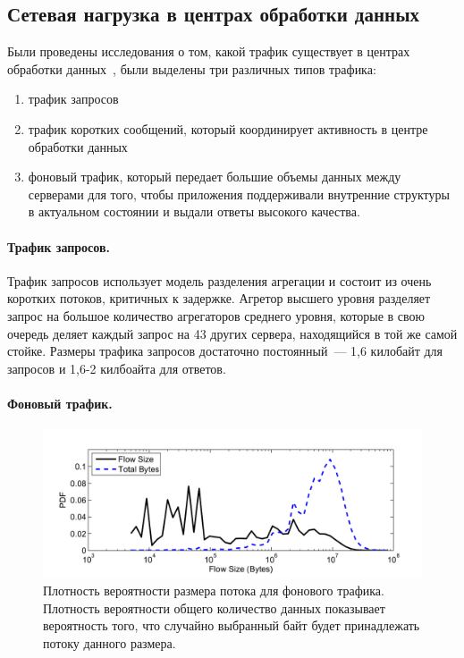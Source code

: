 \documentclass[14pt, a4paper,oneside]{extarticle}
\begin{document}
\subsection{Сетевая нагрузка в центрах обработки данных}
Были проведены исследования о том, какой трафик существует в центрах обработки данных~\cite{dctcp}, были выделены три различных типов трафика:
\begin{enumerate}
\item трафик запросов
\item трафик коротких сообщений, который координирует активность в центре обработки данных
\item фоновый трафик, который передает большие объемы данных между серверами для того, чтобы приложения поддерживали внутренние структуры в актуальном состоянии и выдали ответы высокого качества.
\end{enumerate}

\paragraph{Трафик запросов.}
Трафик запросов использует модель разделения агрегации и состоит из очень коротких потоков, критичных к задержке. Агретор высшего уровня разделяет запрос на большое количество агрегаторов среднего уровня, которые в свою очередь деляет каждый запрос на 43 других сервера, находящийся в той же самой стойке. Размеры трафика запросов достаточно постоянный~--- 1,6 килобайт для запросов и 1,6-2 килбоайта для ответов.

\paragraph{Фоновый трафик.}
\begin{figure}
\includegraphics[width=\linewidth]{pdf_of_flow_size.png}
\caption{Плотность вероятности размера потока для фонового трафика. Плотность вероятности общего количество данных показывает вероятность того, что случайно выбранный байт будет принадлежать потоку данного размера.}
\label{pdf_of_flow_size}
\end{figure}
\end{document}
